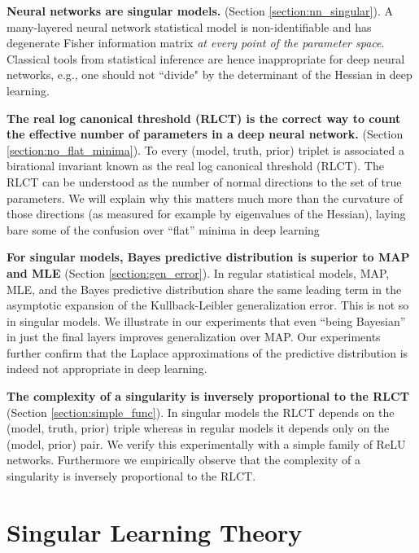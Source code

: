 \documentclass{article} %
\begin{document}
\textbf{Neural networks are singular models.} (Section \ref{section:nn_singular}). A many-layered neural network statistical model is non-identifiable and has degenerate Fisher information matrix \emph{at every point of the parameter space}. Classical tools from statistical inference are hence inappropriate for deep neural networks, e.g., one should not ``divide" by the determinant of the Hessian in deep learning. 

\textbf{The real log canonical threshold (RLCT) is the correct way to count the effective number of parameters in a deep neural network.} (Section \ref{section:no_flat_minima}). 
    To every (model, truth, prior) triplet is associated a birational invariant known as the real log canonical threshold (RLCT). The RLCT can be understood as the number of normal directions to the set of true parameters. We will explain why this matters much more than the curvature of those directions (as measured for example by eigenvalues of the Hessian), laying bare some of the confusion over ``flat'' minima in deep learning 

\textbf{For singular models, Bayes predictive distribution is superior to MAP and MLE} (Section \ref{section:gen_error}). In regular statistical models, MAP, MLE, and the Bayes predictive distribution share the same leading term in the asymptotic expansion of the Kullback-Leibler generalization error. This is not so in singular models. We illustrate in our experiments that even ``being Bayesian'' in just the final layers improves generalization over MAP. Our experiments further confirm that the Laplace approximations of the predictive distribution is indeed not appropriate in deep learning.

\textbf{The complexity of a singularity is inversely proportional to the RLCT} (Section \ref{section:simple_func}). In singular models the RLCT depends on the (model, truth, prior) triple whereas in regular models it depends only on the (model, prior) pair.
     We verify this experimentally with a simple family of ReLU networks. Furthermore we empirically observe that the complexity of a singularity is inversely proportional to the RLCT.


\section{Singular Learning Theory}
\end{document}
